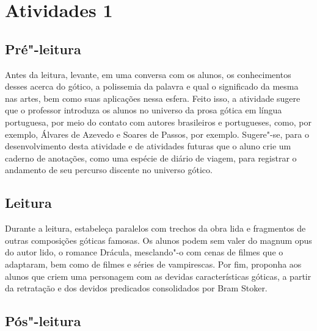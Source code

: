 \documentclass[12pt]{extarticle}
\begin{document}
\tableofcontents


\section{Atividades 1}


\subsection{Pré"-leitura}


Antes da leitura, levante, em uma conversa com os alunos, os
conhecimentos desses acerca do gótico, a polissemia da palavra e qual o
significado da mesma nas artes, bem como suas aplicações nessa esfera.
Feito isso, a atividade sugere que o professor introduza os alunos no
universo da prosa gótica em língua portuguesa, por meio do contato com
autores brasileiros e portugueses, como, por exemplo, Álvares de Azevedo
e Soares de Passos, por exemplo. Sugere"-se, para o desenvolvimento desta
atividade e de atividades futuras que o aluno crie um caderno de
anotações, como uma espécie de diário de viagem, para registrar o
andamento de seu percurso discente no universo gótico.

\subsection{Leitura}


Durante a leitura, estabeleça paralelos com trechos da obra
lida e fragmentos de outras composições góticas famosas. Os alunos podem
sem valer do magnum opus do autor lido, o romance Drácula, mesclando"-o
com cenas de filmes que o adaptaram, bem como de filmes e séries de
vampirescas. Por fim, proponha aos alunos que criem uma personagem com
as devidas características góticas, a partir da retratação e dos devidos
predicados consolidados por Bram Stoker.


\subsection{Pós"-leitura}
\end{document}
